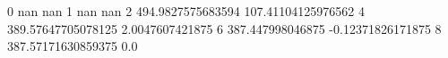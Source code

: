 0 nan nan
1 nan nan
2 494.9827575683594 107.41104125976562
4 389.57647705078125 2.0047607421875
6 387.447998046875 -0.12371826171875
8 387.57171630859375 0.0
